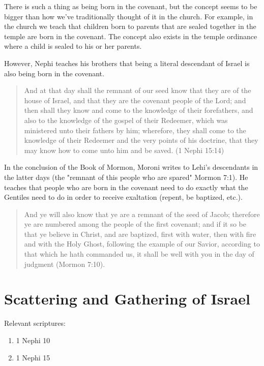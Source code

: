 There is such a thing as being born in the covenant, but the concept seems to be bigger than how we've traditionally thought of it in the church. For example, in the church we teach that children born to parents that are sealed together in the temple are born in the covenant. The concept also exists in the temple ordinance where a child is sealed to his or her parents.

However, Nephi teaches his brothers that being a literal descendant of Israel is also being born in the covenant. 

\begin{quotation}
And at that day shall the remnant of our seed know that they are of the house of Israel, and that they are the covenant people of the Lord; and then shall they know and come to the knowledge of their forefathers, and also to the knowledge of the gospel of their Redeemer, which was ministered unto their fathers by him; wherefore, they shall come to the knowledge of their Redeemer and the very points of his doctrine, that they may know how to come unto him and be saved. (1 Nephi 15:14)
\end{quotation}

In the conclusion of the Book of Mormon, Moroni writes to Lehi's descendants in the latter days (the "remnant of this people who are spared" Mormon 7:1). He teaches that people who are born in the covenant need to do exactly what the Gentiles need to do in order to receive exaltation (repent, be baptized, etc.).

\begin{quotation}
And ye will also know that ye are a remnant of the seed of Jacob; therefore ye are numbered among the people of the first covenant; and if it so be that ye believe in Christ, and are baptized, first with water, then with fire and with the Holy Ghost, following the example of our Savior, according to that which he hath commanded us, it shall be well with you in the day of judgment (Mormon 7:10).
\end{quotation}

\section{Scattering and Gathering of Israel}

Relevant scriptures:
\begin{enumerate}
  \item 1 Nephi 10
  \item 1 Nephi 15
\end{enumerate}


